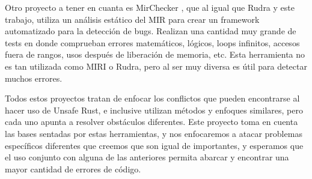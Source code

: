 Otro proyecto a tener en cuanta es MirChecker \cite{li2021mirchecker}, que al igual que Rudra y este trabajo, utiliza un análisis estático del MIR para crear un framework automatizado para la detección de bugs. Realizan una cantidad muy grande de tests en donde comprueban errores matemáticos, lógicos, loops infinitos, accesos fuera de rangos, usos después de liberación de memoria, etc. Esta herramienta no es tan utilizada como MIRI o Rudra, pero al ser muy diversa es útil para detectar muchos errores.

Todos estos proyectos tratan de enfocar los conflictos que pueden encontrarse al hacer uso de Unsafe Rust, e inclusive utilizan métodos y enfoques similares, pero cada uno apunta a resolver obstáculos diferentes. Este proyecto toma en cuenta las bases sentadas por estas herramientas, y nos enfocaremos a atacar problemas específicos diferentes que creemos que son igual de importantes, y esperamos que el uso conjunto con alguna de las anteriores permita abarcar y encontrar una mayor cantidad de errores de código.

